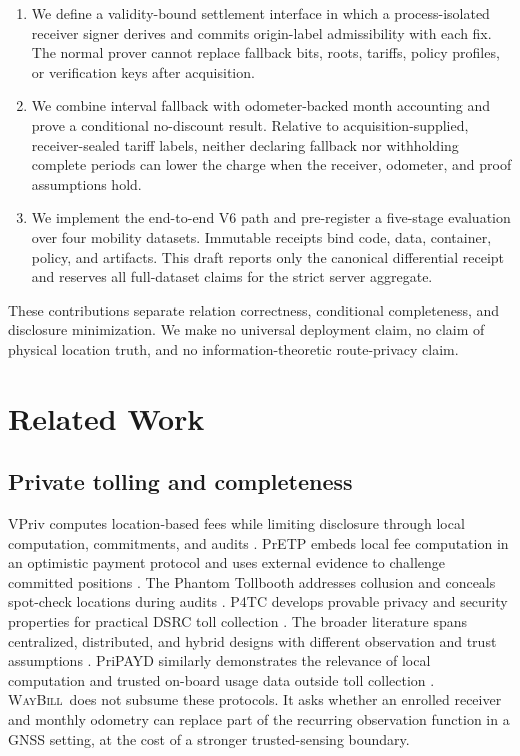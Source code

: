 \documentclass[conference]{IEEEtran}
\theoremstyle{plain}
\theoremstyle{definition}
\newcommand{\system}{\textsc{WayBill}}
\begin{document}
\begin{enumerate}
  \item We define a validity-bound settlement interface in which a
  process-isolated receiver signer derives and commits origin-label
  admissibility with each fix. The normal
  prover cannot replace fallback bits, roots, tariffs, policy profiles, or
  verification keys after acquisition.
  \item We combine interval fallback with odometer-backed month accounting and
  prove a conditional no-discount result. Relative to
  acquisition-supplied, receiver-sealed tariff labels, neither declaring fallback nor
  withholding complete periods can lower the charge when the receiver,
  odometer, and proof assumptions hold.
  \item We implement the end-to-end V6 path and pre-register a five-stage
  evaluation over four mobility datasets. Immutable receipts bind code, data,
  container, policy, and artifacts. This draft reports only the canonical
  differential receipt and reserves all full-dataset claims for the strict
  server aggregate.
\end{enumerate}

These contributions separate relation correctness, conditional completeness,
and disclosure minimization. We make no universal deployment claim, no claim
of physical location truth, and no information-theoretic route-privacy claim.

\section{Related Work}

\subsection{Private tolling and completeness}

VPriv computes location-based fees while limiting disclosure through local
computation, commitments, and audits \cite{Popa2009VPriv}. PrETP embeds local
fee computation in an optimistic payment protocol and uses external evidence
to challenge committed positions \cite{Balasch2010PrETP}. The Phantom
Tollbooth addresses collusion and conceals spot-check locations during audits
\cite{Meiklejohn2011Milo}. P4TC develops provable privacy and security
properties for practical DSRC toll collection \cite{Fetzer2020P4TC}. The
broader literature spans centralized, distributed, and hybrid designs with
different observation and trust assumptions \cite{Jolfaei2023Survey}.
PriPAYD similarly demonstrates the relevance of local computation and trusted
on-board usage data outside toll collection \cite{Troncoso2007PriPAYD}.
\system\ does not subsume these protocols. It asks whether an enrolled receiver
and monthly odometry can replace part of the recurring observation function in
a GNSS setting, at the cost of a stronger trusted-sensing boundary.
\end{document}
